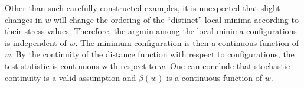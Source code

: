 \documentclass[11pt]{article} %
\begin{document}

Other than such carefully constructed examples, it is  unexpected that slight changes in $w$  will change the ordering of the ``distinct''  local minima according to their stress values.
Therefore,  the argmin among the local minima configurations is independent of $w$. The minimum configuration is then a continuous function of $w$. 
By the continuity of the distance function with respect to configurations, the test statistic is continuous with respect to $w$. One can conclude  that stochastic continuity  is a valid assumption and $\beta(w) $ is a continuous function of $w$. 

 
\end{document}
